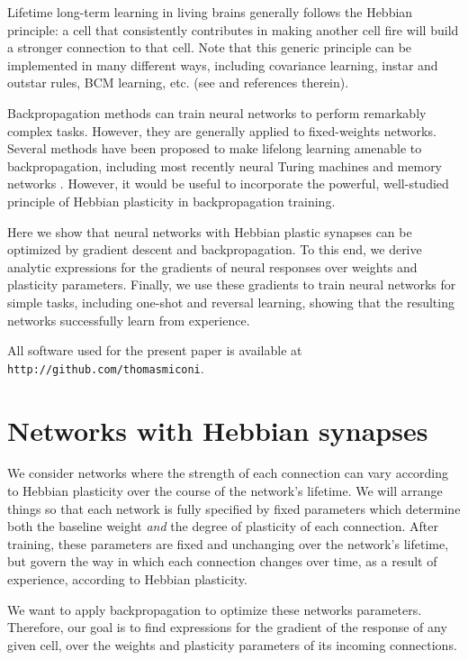 \documentclass{article}
\begin{document}
Lifetime long-term learning in living brains generally follows the Hebbian principle: a
cell that consistently contributes in making another cell fire will build a
stronger connection to that cell. Note that this generic principle can be
implemented in many different ways, including covariance learning, instar and
outstar rules, BCM learning, etc. (see \cite{Vasilkoski2011-ww} and references therein). 

Backpropagation methods can train neural networks to perform remarkably complex
tasks. However, they are generally applied to fixed-weights networks. Several
methods have been proposed to make lifelong learning amenable to
backpropagation, including most recently neural Turing machines
\cite{Graves2014-ch,Santoro2016-jn} and
memory networks \cite{Sukhbaatar2015-ly}. However, it would be useful to incorporate the powerful, well-studied
principle of Hebbian plasticity in backpropagation
training.

Here we show that neural networks with Hebbian plastic synapses can be optimized by
gradient descent and backpropagation. To this end, we derive analytic
expressions for the gradients of neural responses
over weights and plasticity parameters. Finally, we use these gradients to train neural
networks for simple tasks, including one-shot and reversal
learning, showing that the resulting networks
successfully learn from experience.

All software used for the present paper is available at
\texttt{http://github.com/thomasmiconi}.

\section{Networks with Hebbian synapses}

We consider networks where the strength of each connection can vary according to
Hebbian plasticity over the course of the network's lifetime. We will arrange things so that each network is fully specified
by fixed parameters which determine both the baseline weight \emph{and} the degree of plasticity of each connection.
After training, these parameters are fixed and unchanging over the network's
lifetime, but govern the way in which
each connection changes over time, as a result of experience, according to Hebbian plasticity. 

We want to apply backpropagation to optimize these
 networks parameters. Therefore, our goal is to find expressions for the gradient of the response of any
given cell, over the weights and plasticity parameters of its incoming connections.
\end{document}
